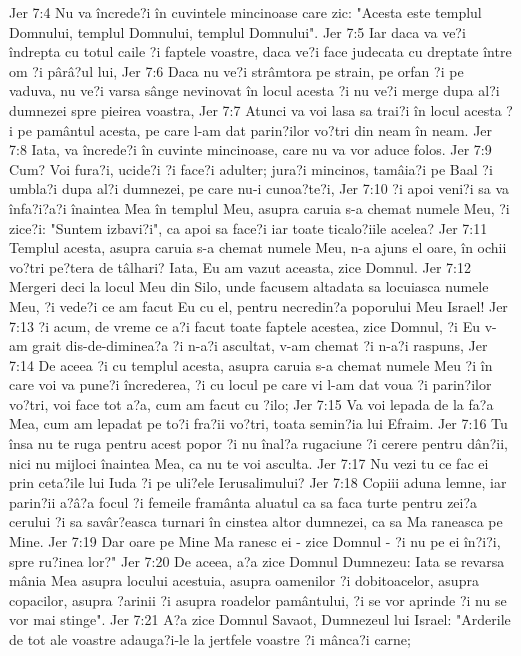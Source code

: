 Jer 7:4  Nu va încrede?i în cuvintele mincinoase care zic: "Acesta este templul Domnului, templul Domnului, templul Domnului".
Jer 7:5  Iar daca va ve?i îndrepta cu totul caile ?i faptele voastre, daca ve?i face judecata cu dreptate între om ?i pârâ?ul lui,
Jer 7:6  Daca nu ve?i strâmtora pe strain, pe orfan ?i pe vaduva, nu ve?i varsa sânge nevinovat în locul acesta ?i nu ve?i merge dupa al?i dumnezei spre pieirea voastra,
Jer 7:7  Atunci va voi lasa sa trai?i în locul acesta ?i pe pamântul acesta, pe care l-am dat parin?ilor vo?tri din neam în neam.
Jer 7:8  Iata, va încrede?i în cuvinte mincinoase, care nu va vor aduce folos.
Jer 7:9  Cum? Voi fura?i, ucide?i ?i face?i adulter; jura?i mincinos, tamâia?i pe Baal ?i umbla?i dupa al?i dumnezei, pe care nu-i cunoa?te?i,
Jer 7:10  ?i apoi veni?i sa va înfa?i?a?i înaintea Mea în templul Meu, asupra caruia s-a chemat numele Meu, ?i zice?i: "Suntem izbavi?i", ca apoi sa face?i iar toate ticalo?iile acelea?
Jer 7:11  Templul acesta, asupra caruia s-a chemat numele Meu, n-a ajuns el oare, în ochii vo?tri pe?tera de tâlhari? Iata, Eu am vazut aceasta, zice Domnul.
Jer 7:12  Mergeri deci la locul Meu din Silo, unde facusem altadata sa locuiasca numele Meu, ?i vede?i ce am facut Eu cu el, pentru necredin?a poporului Meu Israel!
Jer 7:13  ?i acum, de vreme ce a?i facut toate faptele acestea, zice Domnul, ?i Eu v-am grait dis-de-diminea?a ?i n-a?i ascultat, v-am chemat ?i n-a?i raspuns,
Jer 7:14  De aceea ?i cu templul acesta, asupra caruia s-a chemat numele Meu ?i în care voi va pune?i încrederea, ?i cu locul pe care vi l-am dat voua ?i parin?ilor vo?tri, voi face tot a?a, cum am facut cu ?ilo;
Jer 7:15  Va voi lepada de la fa?a Mea, cum am lepadat pe to?i fra?ii vo?tri, toata semin?ia lui Efraim.
Jer 7:16  Tu însa nu te ruga pentru acest popor ?i nu înal?a rugaciune ?i cerere pentru dân?ii, nici nu mijloci înaintea Mea, ca nu te voi asculta.
Jer 7:17  Nu vezi tu ce fac ei prin ceta?ile lui Iuda ?i pe uli?ele Ierusalimului?
Jer 7:18  Copiii aduna lemne, iar parin?ii a?â?a focul ?i femeile framânta aluatul ca sa faca turte pentru zei?a cerului ?i sa savâr?easca turnari în cinstea altor dumnezei, ca sa Ma raneasca pe Mine.
Jer 7:19  Dar oare pe Mine Ma ranesc ei - zice Domnul - ?i nu pe ei în?i?i, spre ru?inea lor?"
Jer 7:20  De aceea, a?a zice Domnul Dumnezeu: Iata se revarsa mânia Mea asupra locului acestuia, asupra oamenilor ?i dobitoacelor, asupra copacilor, asupra ?arinii ?i asupra roadelor pamântului, ?i se vor aprinde ?i nu se vor mai stinge".
Jer 7:21  A?a zice Domnul Savaot, Dumnezeul lui Israel: "Arderile de tot ale voastre adauga?i-le la jertfele voastre ?i mânca?i carne;
